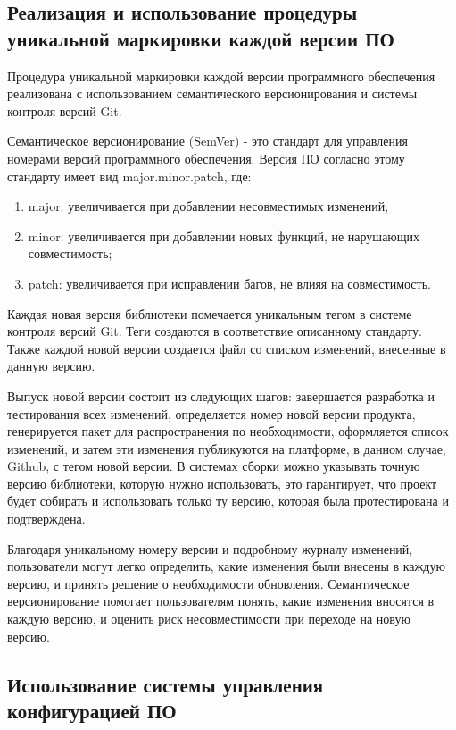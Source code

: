 \subsection{Реализация и использование процедуры уникальной маркировки каждой версии ПО}

Процедура уникальной маркировки каждой версии программного обеспечения реализована с использованием семантического версионирования и системы контроля версий Git.

Семантическое версионирование (SemVer) - это стандарт для управления номерами версий программного обеспечения. Версия ПО согласно этому стандарту имеет вид major.minor.patch, где:

\begin{enumerate}
    \item major: увеличивается при добавлении несовместимых изменений;
    \item minor: увеличивается при добавлении новых функций, не нарушающих совместимость;
    \item patch: увеличивается при исправлении багов, не влияя на совместимость.
\end{enumerate}

Каждая новая версия библиотеки помечается уникальным тегом в системе контроля версий Git. Теги создаются в соответствие описанному стандарту. Также каждой новой версии создается файл со списком изменений, внесенные в данную версию.

Выпуск новой версии состоит из следующих шагов: завершается разработка и тестирования всех изменений, определяется номер новой версии продукта, генерируется пакет для распространения по необходимости, оформляется список изменений, и затем эти изменения публикуются на платформе, в данном случае, Github, с тегом новой версии.
В системах сборки можно указывать точную версию библиотеки, которую нужно использовать, это гарантирует, что проект будет собирать и использовать только ту версию, которая была протестирована и подтверждена.

Благодаря уникальному номеру версии и подробному журналу изменений, пользователи могут легко определить, какие изменения были внесены в каждую версию, и принять решение о необходимости обновления.
Семантическое версионирование помогает пользователям понять, какие изменения вносятся в каждую версию, и оценить риск несовместимости при переходе на новую версию.

\subsection{Использование системы управления конфигурацией ПО}

